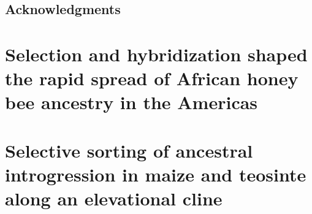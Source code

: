    \doublespacing
   
   \tableofcontents
   \newpage
   
   
   \newpage
   
   \section*{Acknowledgments}
   
   
   \mainmatter
   
   \pagestyle{maintext}
   
   
   \chapter{Selection and hybridization shaped the rapid spread of African honey bee ancestry in the Americas}
   

   \chapter{Selective sorting of ancestral introgression in maize and teosinte along an elevational cline}
   

       
   \backmatter
   
   

   
   
   
   
   
   
